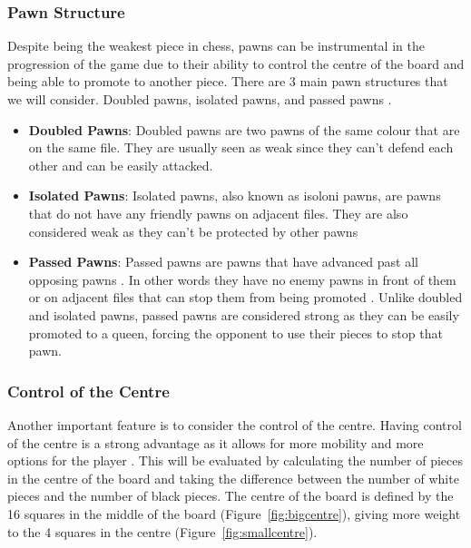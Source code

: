 \documentclass{article}
\begin{document}
\subsubsection{Pawn Structure}
\label{sec:pawnstructure}
Despite being the weakest piece in chess, pawns can be instrumental in the progression of the game
due to their ability to control the centre of the board and being able to promote to another piece. 
There are 3 main pawn structures that we will consider. Doubled pawns, isolated pawns, and passed pawns
\cite{PawnStructureChessprogramming}.

\begin{itemize}
    \item \textbf{Doubled Pawns}: Doubled pawns are two pawns of the same colour that are on the same file.
    They are usually seen as weak since they can't defend each other and can be easily attacked.
    \item \textbf{Isolated Pawns}: Isolated pawns, also known as isoloni pawns, are pawns that do not have
    any friendly pawns on adjacent files. They are also considered weak as they can't be protected by other pawns
    \item \textbf{Passed Pawns}: Passed pawns are pawns that have advanced past all opposing pawns \cite{PassedPawnChesscom}.
    In other words they have no enemy pawns in front of them or on adjacent files that can stop them from 
    being promoted \cite{PassedPawnChesscom}. Unlike doubled and isolated pawns, passed pawns are considered
    strong as they can be easily promoted to a queen, forcing the opponent to use their pieces to stop that pawn.
\end{itemize}



\subsubsection{Control of the Centre}
Another important feature is to consider the control of the centre. Having control of the centre 
is a strong advantage as it allows for more mobility and more options for the player \cite{mikhalchishinCentreModernStrategy}. This will be evaluated
by calculating the number of pieces in the centre of the board and taking the difference between the
number of white pieces and the number of black pieces. The centre of the board is defined by the 16 squares
in the middle of the board (Figure~\ref{fig:bigcentre}), giving more weight to the 4 squares in the centre (Figure~\ref{fig:smallcentre}).
\end{document}
